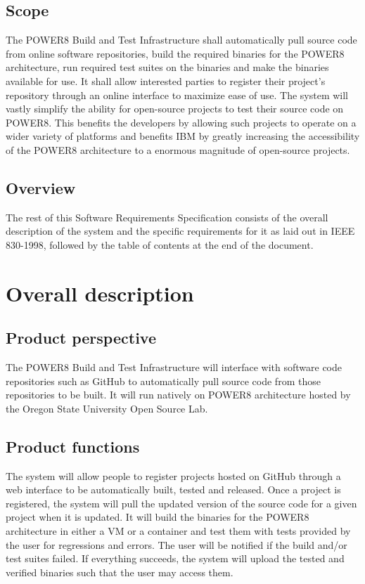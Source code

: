 \documentclass[10pt,letterpaper,onecolumn,draftclsnofoot]{IEEEtran}
\begin{document}
\subsection{Scope}
The POWER8 Build and Test Infrastructure shall automatically pull source code from online software repositories, build the required binaries for the POWER8 architecture, run required test suites on the binaries and make the binaries available for use. It shall allow interested parties to register their project's repository through an online interface to maximize ease of use. The system will vastly simplify the ability for open-source projects to test their source code on POWER8. This benefits the developers by allowing such projects to operate on a wider variety of platforms and benefits IBM by greatly increasing the accessibility of the POWER8 architecture to a enormous magnitude of open-source projects.
\subsection{Overview}
The rest of this Software Requirements Specification consists of the overall description of the system and the specific requirements for it as laid out in IEEE 830-1998, followed by the table of contents at the end of the document.

\section{Overall description}
\subsection{Product perspective}
The POWER8 Build and Test Infrastructure will interface with software code repositories such as GitHub to automatically pull source code from those repositories to be built. It will run natively on POWER8 architecture hosted by the Oregon State University Open Source Lab.
\subsection{Product functions}
The system will allow people to register projects hosted on GitHub through a web interface to be automatically built, tested and released. Once a project is registered, the system will pull the updated version of the source code for a given project when it is updated. It will build the binaries for the POWER8 architecture in either a VM or a container and test them with tests provided by the user for regressions and errors. The user will be notified if the build and/or test suites failed. If everything succeeds, the system will upload the tested and verified binaries such that the user may access them.
\end{document}
